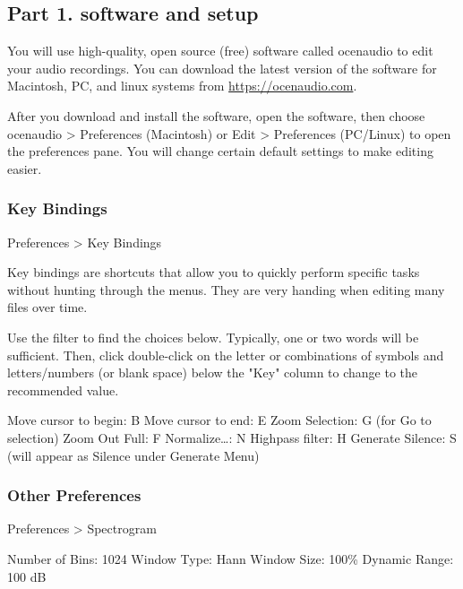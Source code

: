 \documentclass[12pt]{article}
\begin{document}
\thispagestyle{plain}

\subsection*{Part 1. software and setup}

You will use high-quality, open source (free) software called ocenaudio to edit your audio recordings. You can download the latest version of the software for Macintosh, PC, and linux systems from \url{https://ocenaudio.com}.

After you download and install the software, open the software, then choose ocenaudio > Preferences (Macintosh) or Edit > Preferences (PC/Linux) to open the preferences pane. You will change certain default settings to make editing easier.

\subsubsection*{Key Bindings}

Preferences > Key Bindings


Key bindings are shortcuts that allow you to quickly perform specific tasks without hunting through the menus. They are very handing when editing many files over time.


Use the filter to find the choices below. Typically, one or two words will be sufficient. Then, click double-click on the letter or combinations of symbols and letters/numbers (or blank space) below the "Key" column to change to the recommended value.

Move cursor to begin: B\newline
Move cursor to end: E\newline
Zoom Selection: G (for Go to selection)\newline
Zoom Out Full: F\newline
Normalize\ldots: N\newline
Highpass filter: H\newline
Generate Silence: S (will appear as Silence under Generate Menu)


\subsubsection*{Other Preferences}

Preferences > Spectrogram

Number of Bins: 1024\newline
Window Type: Hann\newline
Window Size: 100\%\newline
Dynamic Range: 100 dB
\end{document}
